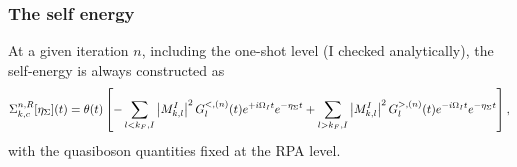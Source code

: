 \subsubsection{The self energy}
At a given iteration $n$, including the one-shot level (I checked analytically), the self-energy is always constructed as 
\begin{equation}
    \Sigma_{k, c}^{n,R}[\eta_{\Sigma}](t)=\theta(t)\left[-\sum_{l<k_F, I}\left|M_{ k,l}^I\right|^2 G_{l}^{<,(n)}(t) e^{+i \Omega_I t} e^{-\eta_{\Sigma} t} + \sum_{l>k_F, I}\left|M_{ k,l}^I\right|^2 G_{l}^{>,(n)}(t) e^{-i \Omega_I t} e^{- \eta_{\Sigma} t}\right],
\end{equation}
with the quasiboson quantities fixed at the RPA level. 
